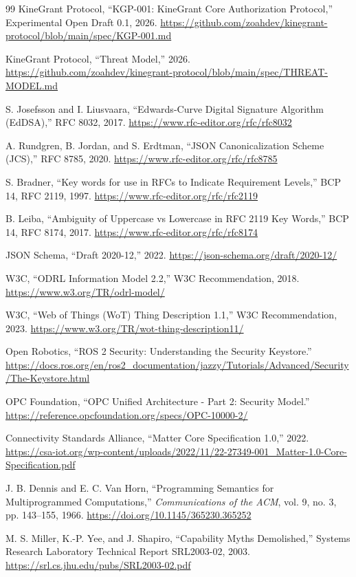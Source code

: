 \documentclass[10.5pt,a4paper]{article}
\begin{document}
\begin{thebibliography}{99}
\small
{} KineGrant Protocol, ``KGP-001: KineGrant Core Authorization Protocol,''
Experimental Open Draft 0.1, 2026. \url{https://github.com/zoahdev/kinegrant-protocol/blob/main/spec/KGP-001.md}

 KineGrant Protocol, ``Threat Model,'' 2026.
\url{https://github.com/zoahdev/kinegrant-protocol/blob/main/spec/THREAT-MODEL.md}

 S. Josefsson and I. Liusvaara, ``Edwards-Curve Digital Signature Algorithm
(EdDSA),'' RFC 8032, 2017. \url{https://www.rfc-editor.org/rfc/rfc8032}

 A. Rundgren, B. Jordan, and S. Erdtman, ``JSON Canonicalization Scheme
(JCS),'' RFC 8785, 2020. \url{https://www.rfc-editor.org/rfc/rfc8785}

 S. Bradner, ``Key words for use in RFCs to Indicate Requirement Levels,''
BCP 14, RFC 2119, 1997. \url{https://www.rfc-editor.org/rfc/rfc2119}

 B. Leiba, ``Ambiguity of Uppercase vs Lowercase in RFC 2119 Key Words,''
BCP 14, RFC 8174, 2017. \url{https://www.rfc-editor.org/rfc/rfc8174}

 JSON Schema, ``Draft 2020-12,'' 2022.
\url{https://json-schema.org/draft/2020-12/}

 W3C, ``ODRL Information Model 2.2,'' W3C Recommendation, 2018.
\url{https://www.w3.org/TR/odrl-model/}

 W3C, ``Web of Things (WoT) Thing Description 1.1,'' W3C Recommendation, 2023.
\url{https://www.w3.org/TR/wot-thing-description11/}

 Open Robotics, ``ROS 2 Security: Understanding the Security Keystore.''
\url{https://docs.ros.org/en/ros2_documentation/jazzy/Tutorials/Advanced/Security/The-Keystore.html}

 OPC Foundation, ``OPC Unified Architecture - Part 2: Security Model.''
\url{https://reference.opcfoundation.org/specs/OPC-10000-2/}

 Connectivity Standards Alliance, ``Matter Core Specification 1.0,'' 2022.
\url{https://csa-iot.org/wp-content/uploads/2022/11/22-27349-001_Matter-1.0-Core-Specification.pdf}

 J. B. Dennis and E. C. Van Horn, ``Programming Semantics for
Multiprogrammed Computations,'' \emph{Communications of the ACM}, vol. 9, no. 3,
pp. 143--155, 1966. \url{https://doi.org/10.1145/365230.365252}

 M. S. Miller, K.-P. Yee, and J. Shapiro, ``Capability Myths
Demolished,'' Systems Research Laboratory Technical Report SRL2003-02, 2003.
\url{https://srl.cs.jhu.edu/pubs/SRL2003-02.pdf}
\end{thebibliography}
\end{document}
